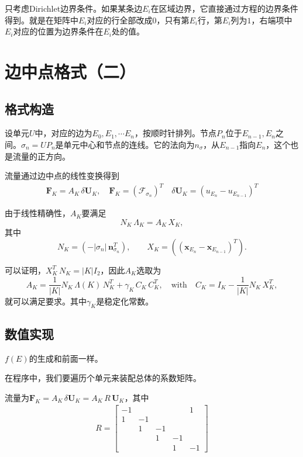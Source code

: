 \documentclass[12pt,a4paper]{article}
\theoremstyle{plain}
\begin{document}
只考虑Dirichlet边界条件。如果某条边$E_i$在区域边界，它直接通过方程的边界条件得到。就是在矩阵中$E_i$对应的行全部改成0，只有第$E_i$行，第$E_i$列为$1$，右端项中$E_i$对应的位置为边界条件在$E_i$处的值。

\section*{边中点格式（二）}

\subsection*{格式构造}

设单元$U$中，对应的边为$E_0, E_1, \cdots E_n$，按顺时针排列。节点$P_n$位于$E_{n-1}, E_{n}$之间。$\sigma_n = U P_{n}$是单元中心和节点的连线。它的法向为$n_\sigma$，从$E_{n-1}$指向$E_n$，这个也是流量的正方向。

流量通过边中点的线性变换得到
\begin{align*}
\mathbf{F}_{K} = A_K \, \delta \mathbf{U}_{K}, \quad \mathbf{F}_{K} = (\mathcal{F}_{\sigma_{n}})^T \quad \delta \mathbf{U}_{K} = (u_{E_{n}} - u_{E_{n-1}})^T
\end{align*}

由于线性精确性，$A_K$要满足
\begin{equation*}\label{lp-mat}
N_{K} \, \Lambda_{K} = A_{K} \, X_{K},
\end{equation*}
其中
\begin{equation*}\label{def-nx}
N_K = (- |\sigma_n| \, \mathbf{n}_{\sigma_n}^T), \qquad X_K = ((\mathbf{x}_{E_{n}} - \mathbf{x}_{E_{n-1}})^T).
\end{equation*}

可以证明，$X_K^T \, N_K = |K| I_2$，因此$A_K$选取为
\begin{equation*}
A_K = \frac{1}{|K|} N_K \, \Lambda(K) \, N_K^T + \gamma_K \, C_K \, C_K^T, \quad  \text{with} \quad C_K = I_K - \frac{1}{|K|} N_K \, X_K^T,
\end{equation*}
就可以满足要求。其中$\gamma_K$是稳定化常数。

\subsection*{数值实现}

$f(E)$的生成和前面一样。

在程序中，我们要遍历个单元来装配总体的系数矩阵。

流量为$ \mathbf{F}_{K} = A_K \, \delta \mathbf{U}_{K} = A_K \, R \, \mathbf{U}_{K} $，其中
\begin{align*}
R =
\left[
\begin{matrix}
-1 &  &  &  & 1 \\
1 & -1 &  &  &  \\
 & 1 & -1 &  &  \\
 &  & 1 & -1 &  \\
 &  &  & 1 & -1
\end{matrix}
\right]
\end{align*}
\end{document}
